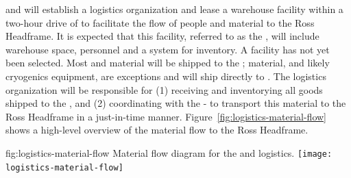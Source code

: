  and  will establish a logistics organization and lease a warehouse facility within a two-hour drive of   to facilitate the flow of people and material to the Ross Headframe.  It is expected that this facility, referred to as the , will include warehouse space, personnel and a  system for inventory.  A facility has not yet been selected. 
Most  and  material will be shipped to the ;  material, and likely cryogenics equipment, are exceptions and will ship directly to . The logistics  organization will be responsible for (1) receiving and inventorying all  goods shipped to the , and (2) coordinating with the -  to transport this material to the Ross Headframe in a just-in-time manner. Figure~\ref{fig:logistics-material-flow} shows a high-level overview of the material flow to the Ross Headframe.


 
 
\begin{dunefigure}{fig:logistics-material-flow}
  {Material flow diagram for the  and  logistics.}
 \texttt{[image: logistics-material-flow]}
\end{dunefigure}

